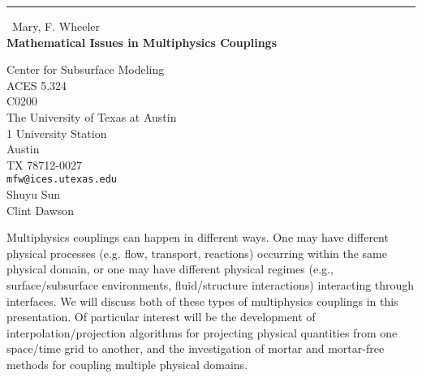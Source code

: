 \documentclass{report}
\begin{document}
\begin{center}
\rule{6in}{1pt} \
{\large Mary, F. Wheeler \\
{\bf Mathematical Issues in Multiphysics Couplings}}

Center for Subsurface Modeling \\ ACES 5.324 \\ C0200 \\ The University of Texas at Austin \\ 1 University Station \\ Austin \\ TX 78712-0027
\\
{\tt mfw@ices.utexas.edu}\\
Shuyu Sun\\
Clint Dawson\end{center}

Multiphysics couplings can happen in different ways. One may have
different physical processes (e.g. flow, transport, reactions) occurring
within the same physical domain, or one may have different physical
regimes (e.g., surface/subsurface environments, fluid/structure
interactions) interacting through interfaces. We will discuss both of
these types of multiphysics couplings in this presentation. Of particular
interest will be the development of interpolation/projection algorithms
for projecting physical quantities from one space/time grid to another,
and the investigation of mortar and mortar-free methods for coupling
multiple physical domains.
\end{document}
